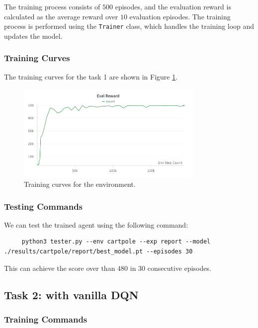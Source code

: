 The training process consists of $500$ episodes, and the evaluation reward is calculated as the average reward over $10$ evaluation episodes.
The training process is performed using the \texttt{Trainer} class, which handles the training loop and updates the model.

\subsubsection{Training Curves}

The training curves for the task 1 are shown in Figure \ref{fig:cartpole-training-curve}.

\begin{figure}[H]
    \centering
    \includegraphics[width=0.8\textwidth]{figures/task1.png}
    \caption{Training curves for the \cartpole environment.}
    \label{fig:cartpole-training-curve}
\end{figure}

\subsubsection{Testing Commands}

We can test the trained agent using the following command:
\begin{verbatim}
     python3 tester.py --env cartpole --exp report --model ./results/cartpole/report/best_model.pt --episodes 30
\end{verbatim}

This can achieve the score over than $480$ in 30 consecutive episodes.

\subsection{Task 2: \pong with vanilla DQN}

\subsubsection{Training Commands}

